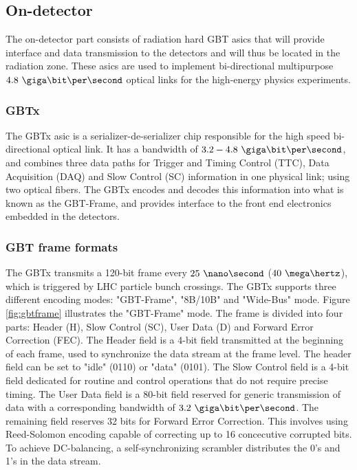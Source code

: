 \documentclass[main.tex]{subfiles}
\begin{document}
\subsection{On-detector}
The on-detector part consists of radiation hard GBT \acrshort{asic}s that will provide interface and data transmission to the detectors and will thus be located in the radiation zone. These \glspl{asic} are used to implement bi-directional multipurpose $4.8~\giga\bit\per\second$ optical links for the high-energy physics experiments.

\subsubsection{GBTx}
The GBTx \gls{asic} is a serializer-de-serializer chip responsible for the high speed bi-directional optical link. It has a bandwidth of $3.2 - 4.8~\giga\bit\per\second$, and combines three data paths for Trigger and Timing Control (TTC), Data Acquisition (DAQ) and Slow Control (SC) information in one physical link; using two optical fibers. The GBTx encodes and decodes this information into what is known as the GBT-Frame, and provides interface to the front end electronics embedded in the detectors. \cite{gbtxman11}

\subsubsection{GBT frame formats} \label{sub:encodings}
 The GBTx transmits a 120-bit frame every $25~\nano\second$ ($40~\mega\hertz$), which is triggered by LHC particle bunch crossings. The GBTx supports three different encoding modes: "GBT-Frame", "8B/10B" and "Wide-Bus" mode. Figure \ref{fig:gbtframe} illustrates the "GBT-Frame" mode. The frame is divided into four parts: Header (H), Slow Control (SC), User Data (D) and Forward Error Correction (FEC). The Header field is a 4-bit field transmitted at the beginning of each frame, used to synchronize the data stream at the frame level. The header field can be set to "idle" (0110) or "data" (0101). The Slow Control field is a 4-bit field dedicated for routine and control operations that do not require precise timing. The User Data field is a 80-bit field reserved for generic transmission of data with a corresponding bandwidth of $3.2~\giga\bit\per\second$. The remaining field reserves 32 bits for Forward Error Correction. This involves using Reed-Solomon encoding capable of correcting up to 16 concecutive corrupted bits. To achieve DC-balancing, a self-synchronizing scrambler distributes the 0's and 1's in the data stream.
\end{document}
